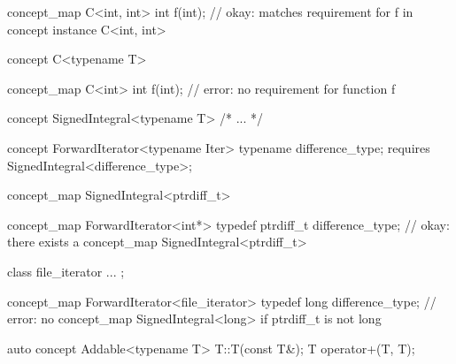 \documentclass[american]{book}
\begin{document}
\begin{paras}
\begin{codeblock}
concept_map C<int, int> {
  int f(int); // okay: matches requirement for f in concept instance C<int, int>
}
\end{codeblock}
\addedConcepts{\mbox{\exitexample}}

\pnum
{}
\begin{codeblock}
concept C<typename T> { }

concept_map C<int> {
  int f(int); // error: no requirement for function f
}
\end{codeblock}
\addedConcepts{\mbox{\exitexample}}

\pnum 
{}
\begin{codeblock}
concept SignedIntegral<typename T> { /* ... */ }

concept ForwardIterator<typename Iter> {
  typename difference_type;
  requires SignedIntegral<difference_type>;
}

concept_map SignedIntegral<ptrdiff_t> { }

concept_map ForwardIterator<int*> {
  typedef ptrdiff_t difference_type;
} // okay: there exists a concept_map SignedIntegral<ptrdiff_t>

class file_iterator { ... };

concept_map ForwardIterator<file_iterator> {
  typedef long difference_type;
} // error: no concept_map SignedIntegral<long> if ptrdiff_t is not long
\end{codeblock} 
\addedConcepts{\mbox{\exitexample}}

\pnum
{} 
\begin{codeblock}
auto concept Addable<typename T> {
  T::T(const T&);
  T operator+(T, T);
}


\end{codeblock}
\end{paras}
\end{document}
